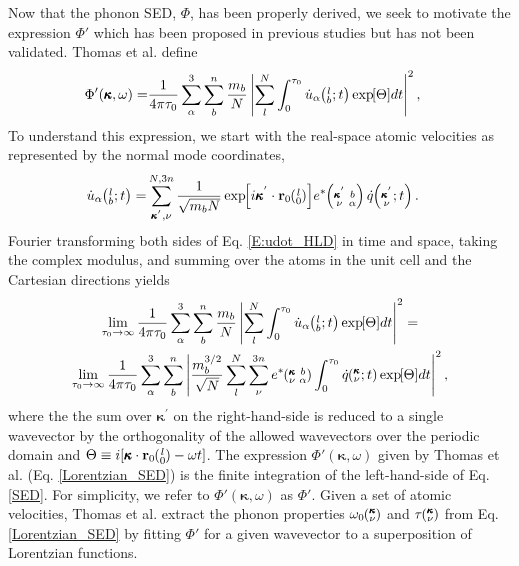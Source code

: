 \documentclass[12pt,twocolumn,iop]{/usr/share/texmf-texlive/tex/latex/iop/iopart}[/usr/share/texmf-texlive/tex/latex/iop/]
\newcommand{\EXP}[1]{\exp\mspace{-5.0mu}\left[#1\right]\mspace{-3.0mu}}
\newcommand{\SUMprime}[2]{\ifthenelse{\equal{#1}{0}}{\sum_{\alpha_{#2},b_{#2},l_{#2}}^{3,n,N}} {\ifthenelse{\equal{#1}{1}}{\sum_{\alpha_{#2},b_{#2}}^{3,n}}{\sum_{\pmb{\kappa}^{'}#2,\nu#2}^{N,3n}}}}
\newcommand{\ab}[2]{\mspace{-4.0mu}\left(\mspace{-8.0mu}\begin{smallmatrix}&\ifthenelse{\equal{#1}{}}{a}{#1} \\&\ifthenelse{\equal{#2}{}}{b}{#2}\end{smallmatrix}\mspace{-3.0mu}\right)}
\newcommand{\kvba}{\mspace{-4.0mu}\left(\mspace{-8.0mu}\begin{smallmatrix} &\pmb{\kappa} &b \\ &\nu &\alpha\end{smallmatrix}\mspace{-3.0mu}\right)}
\newcommand{\kpvba}{\mspace{-4.0mu}\left(\mspace{-8.0mu}\begin{smallmatrix} &\pmb{\kappa}^{'} &b \\ &\nu &\alpha\end{smallmatrix}\mspace{-3.0mu}\right)}
\newcommand{\kvt}{\mspace{-4.0mu}\left(\mspace{-8.0mu}\begin{smallmatrix}&\pmb{\kappa} \\&\nu\end{smallmatrix}\mspace{-2.0mu};t\right)}
\newcommand{\kpvt}{\mspace{-4.0mu}\left(\mspace{-8.0mu}\begin{smallmatrix}&\pmb{\kappa}^{'} \\&\nu\end{smallmatrix}\mspace{-2.0mu};t\right)}
\newcommand{\kv}{\mspace{-4.0mu}\left(\mspace{-8.0mu}\begin{smallmatrix}&\pmb{\kappa} \\&\nu\end{smallmatrix}\mspace{-3.0mu}\right)}
\newcommand{\lbt}{\mspace{-4.0mu}\left(\mspace{-8.0mu}\begin{smallmatrix}&l \\&b\end{smallmatrix}\mspace{-2.0mu};t\right)}
\begin{document}
Now that the phonon SED, $\Phi$, has been properly derived, we seek to motivate the expression $\Phi'$ which has been proposed in previous studies but has not been validated.\cite{maruyama2003,shiomi2006,thomas2010c} Thomas et al. \cite{thomas2010c} define
\begin{equation}\label{Lorentzian_SED}
\begin{split}
\Phi'(\pmb{\kappa},\omega) =& \frac{1}{4\pi\tau_0} \sum_\alpha^3 \sum_b^n \frac{m_b}{N}\left| \sum_l^N  \int_{0}^{\tau_0} \dot{u}_{\alpha}\lbt \EXP{\Theta} dt \right|^2,
\end{split}
\end{equation}
To understand this expression, we start with the real-space atomic velocities as
represented by the normal mode coordinates,\cite{dove1993}
\begin{equation}\label{E:udot_HLD}
\begin{split}
\dot{u}_{\alpha}\lbt = &\SUMprime{2}{} \frac{1}{\sqrt{m_bN}} \EXP{i\pmb{\kappa}^{'}\cdot\mathbf{r}_0\ab{l}{0}} e^*\kpvba \dot{q}\kpvt{}{}{}.
\end{split}
\end{equation}
Fourier transforming both sides of Eq$.$ \eqref{E:udot_HLD} in time and space, taking the complex modulus, and summing over the atoms in the unit cell and the Cartesian directions yields
\begin{multline}\label{SED}
\lim_{\tau_0\rightarrow\infty}\frac{1}{4\pi\tau_0} \sum_\alpha^3 \sum_b^n \frac{m_b}{N} \left\lvert \sum_l^N  \int_{0}^{\tau_0} \dot{u}_{\alpha}\lbt \EXP{\Theta} dt \right\rvert^2 =
\\ \lim_{\tau_0\rightarrow\infty}\frac{1}{4\pi\tau_0} \sum_\alpha^3 \sum_b^n \left\lvert \frac{m_b^{3/2}}{\sqrt{N}} \sum_l^N \sum_{\nu}^{3n} e^*\kvba \int_{0}^{\tau_0}\dot{q}\kvt\EXP{\Theta}dt \right\rvert^2 ,
\end{multline}
where the the sum over $\pmb{\kappa}^{'}$ on the right-hand-side is reduced to a single wavevector by the orthogonality of the allowed wavevectors over the periodic domain and $\Theta \equiv i[\pmb{\kappa}\cdot\mathbf{r}_0\ab{l}{0}-\omega t]$. The expression $\Phi'(\pmb{\kappa},\omega)$ given by Thomas et al. \cite{thomas2010c} (Eq$.$ \eqref{Lorentzian_SED}) is the finite integration of the left-hand-side of Eq$.$ \eqref{SED}. For simplicity, we refer to $\Phi'(\pmb{\kappa},\omega)$ as $\Phi'$. Given a set of atomic velocities, Thomas et al. extract the phonon properties $\omega_0\kv$ and $\tau\kv$ from Eq$.$ \eqref{Lorentzian_SED} by fitting $\Phi'$ for a given wavevector to a superposition of Lorentzian functions.
\end{document}
